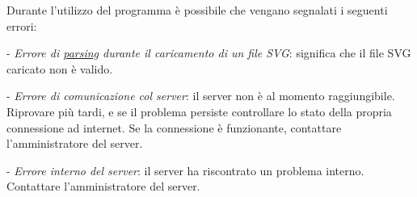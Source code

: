  
Durante l'utilizzo del programma \`e possibile che vengano segnalati i seguenti errori:
\begin{elencopuntato}[\subsecindent]
\item[-] \textit{Errore di \underline{parsing} durante il caricamento di un file SVG}: significa che il file SVG caricato non \`e valido.
\item[-] \textit{Errore di comunicazione col server}: il server non \`e al momento raggiungibile. Riprovare pi\`u tardi, e se il problema persiste controllare lo stato della propria connessione ad internet. Se la connessione \`e funzionante, contattare l'amministratore del server.
\item[-] \textit{Errore interno del server}: il server ha riscontrato un problema interno. Contattare l'amministratore del server.
\end{elencopuntato} 

